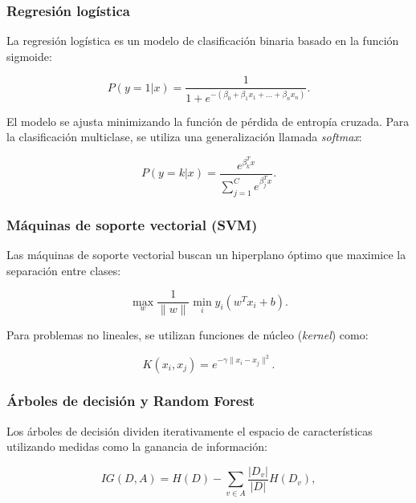 \begin{itemize}
		\subsubsection{Regresión logística}
		
		La regresión logística es un modelo de clasificación binaria basado en la función sigmoide:
		
		\begin{equation}
			P(y=1 | x) = \frac{1}{1 + e^{-(\beta_0 + \beta_1 x_1 + \dots + \beta_n x_n)} }.
		\end{equation}
		
		El modelo se ajusta minimizando la función de pérdida de entropía cruzada. Para la clasificación multiclase, se utiliza una generalización llamada \textit{softmax}:
		
		\begin{equation}
			P(y = k | x) = \frac{e^{\beta_k^T x}}{\sum_{j=1}^{C} e^{\beta_j^T x}}.
		\end{equation}
		
		\subsubsection{Máquinas de soporte vectorial (SVM)}
		
		Las máquinas de soporte vectorial buscan un hiperplano óptimo que maximice la separación entre clases:
		
		\begin{equation}
			\max_w \frac{1}{\| w \|} \min_i y_i (w^T x_i + b).
		\end{equation}
		
		Para problemas no lineales, se utilizan funciones de núcleo (\textit{kernel}) como:
		
		\begin{equation}
			K(x_i, x_j) = e^{-\gamma \| x_i - x_j \|^2}.
		\end{equation}
		
		\subsubsection{Árboles de decisión y Random Forest}
		
		Los árboles de decisión dividen iterativamente el espacio de características utilizando medidas como la ganancia de información:
		
		\begin{equation}
			IG(D, A) = H(D) - \sum_{v \in A} \frac{|D_v|}{|D|} H(D_v),
		\end{equation}
		

\end{itemize}

